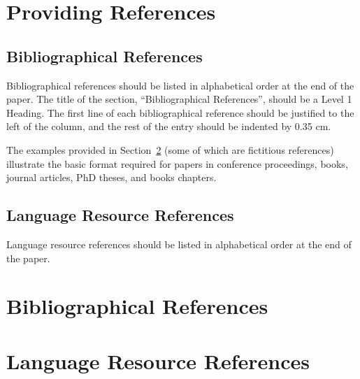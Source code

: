 \documentclass[10pt, a4paper]{article}
\begin{document}
\section{Providing References}

\subsection{Bibliographical References} 

Bibliographical references should be listed in alphabetical order at the end of the paper. The title of the section, ``Bibliographical References'', should be a Level 1 Heading. The first line of each bibliographical reference should be justified to the left of the column, and the rest of the entry should be indented by 0.35 cm.

The examples provided in Section~\ref{sec:reference} (some of which are fictitious references) illustrate the basic format required for papers in conference proceedings, books, journal articles, PhD theses, and books chapters.

\subsection{Language Resource References}

Language resource references should be listed in alphabetical order at the end of the paper.

\nocite{*}
\section{Bibliographical References}\label{sec:reference}




\section{Language Resource References}
\label{lr:ref}
\end{document}
